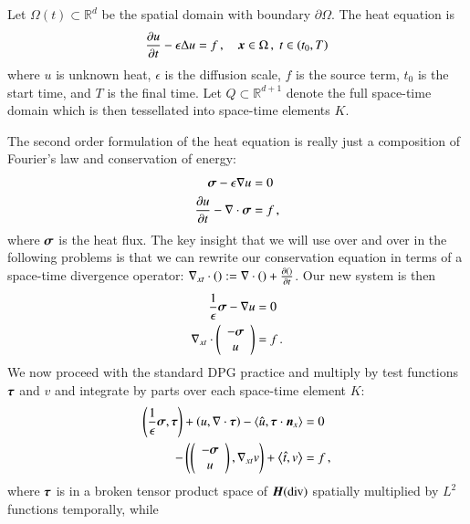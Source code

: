 \documentclass[preprint,12pt]{elsarticle}
\begin{document}
Let $\Omega(t)\subset\mathbb{R}^d$ be the spatial domain with boundary $\partial\Omega$.
The heat equation is
\begin{equation}
	\frac{\partial u}{\partial t}-\epsilon\Delta u=f\,,\quad\boldsymbol x\in\Omega\,,\;t\in(t_0,T)
\end{equation}
where $u$ is unknown heat, $\epsilon$ is the diffusion scale, $f$ is the source term, $t_0$ is the start time, and $T$ is the final time.
Let $Q\subset\mathbb{R}^{d+1}$ denote the full space-time domain which is then tessellated into space-time elements $K$.

The second order formulation of the heat equation is really just a composition of Fourier's law and conservation of energy:
\begin{equation}
\label{eq:heatFirstOrder}
\begin{aligned}
\boldsymbol\sigma-\epsilon\nabla u&=0\\
\frac{\partial u}{\partial t}-\nabla\cdot\boldsymbol\sigma&=f\,,
\end{aligned}
\end{equation}
where $\boldsymbol\sigma$ is the heat flux.
The key insight that we will use over and over in the following problems is that we can rewrite our conservation equation
in terms of a space-time divergence operator: $\nabla_{xt}\cdot():=\nabla\cdot()+\frac{\partial()}{\partial t}$.
Our new system is then
\begin{equation}
\label{eq:heatFirstOrderSpaceTime}
\begin{aligned}
\frac{1}{\epsilon}\boldsymbol\sigma-\nabla u&=0\\
\nabla_{xt}\cdot\left( \begin{array}{c} -\boldsymbol\sigma\\ u\\ \end{array} \right)&=f\,.
\end{aligned}
\end{equation}
We now proceed with the standard DPG practice and multiply by test functions $\boldsymbol\tau$ and $v$ 
and integrate by parts over each space-time element $K$:
\begin{equation}
\label{eq:heatBF}
\begin{aligned}
\left( \frac{1}{\epsilon}\boldsymbol\sigma,\boldsymbol\tau \right)+\left( u,\nabla\cdot\boldsymbol\tau \right)-\left\langle \hat u,\boldsymbol\tau\cdot\boldsymbol n_x \right\rangle&=0\\
-\left( \left( \begin{array}{c} -\boldsymbol\sigma\\ u\\ \end{array} \right),\nabla_{xt} v \right)+\left\langle \hat t,v \right\rangle&=f\,,
\end{aligned}
\end{equation}
where
$\boldsymbol\tau$ is in a broken tensor product space of $\mbox{\boldmath $H$}(\text{div})$ spatially multiplied by $L^2$ functions temporally, while 
\end{document}
